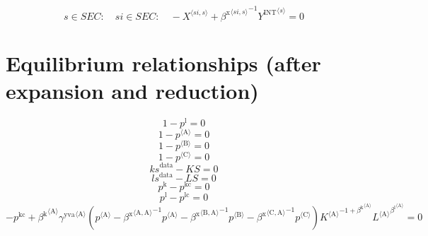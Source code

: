 \begin{equation}
s\in {S\!E\!C}\colon\quad {s\!i}\in {S\!E\!C}\colon\quad -{X}^{\langle {s\!i},s\rangle} + {{\beta^{\mathrm{x}}}^{\langle {s\!i},s\rangle}}^{-1} {{Y^{\mathrm{INT}}}^{\langle s\rangle}} = 0
\end{equation}



\section{Equilibrium relationships (after expansion and reduction)}

\begin{equation}
1 - p^{\mathrm{l}} = 0
\end{equation}
\begin{equation}
1 - {p}^{\langle \mathrm{A}\rangle} = 0
\end{equation}
\begin{equation}
1 - {p}^{\langle \mathrm{B}\rangle} = 0
\end{equation}
\begin{equation}
1 - {p}^{\langle \mathrm{C}\rangle} = 0
\end{equation}
\begin{equation}
{k\!s}^{\mathrm{data}} - {K\!S} = 0
\end{equation}
\begin{equation}
{l\!s}^{\mathrm{data}} - {L\!S} = 0
\end{equation}
\begin{equation}
p^{\mathrm{k}} - p^{\mathrm{kc}} = 0
\end{equation}
\begin{equation}
p^{\mathrm{l}} - p^{\mathrm{lc}} = 0
\end{equation}
\begin{equation}
-p^{\mathrm{kc}} + {{\beta^{\mathrm{k}}}^{\langle \mathrm{\mathrm{A}}\rangle}} {{\gamma^{\mathrm{yva}}}^{\langle \mathrm{\mathrm{A}}\rangle}} \left({p}^{\langle \mathrm{A}\rangle} - {{\beta^{\mathrm{x}}}^{\langle \mathrm{\mathrm{A}},\mathrm{\mathrm{A}}\rangle}}^{-1} {{p}^{\langle \mathrm{A}\rangle}} - {{\beta^{\mathrm{x}}}^{\langle \mathrm{\mathrm{B}},\mathrm{\mathrm{A}}\rangle}}^{-1} {{p}^{\langle \mathrm{B}\rangle}} - {{\beta^{\mathrm{x}}}^{\langle \mathrm{\mathrm{C}},\mathrm{\mathrm{A}}\rangle}}^{-1} {{p}^{\langle \mathrm{C}\rangle}}\right) {{{K}^{\langle \mathrm{A}\rangle}}^{-1 + {\beta^{\mathrm{k}}}^{\langle \mathrm{\mathrm{A}}\rangle}}} {{{L}^{\langle \mathrm{A}\rangle}}^{{\beta^{\mathrm{l}}}^{\langle \mathrm{\mathrm{A}}\rangle}}} = 0
\end{equation}
